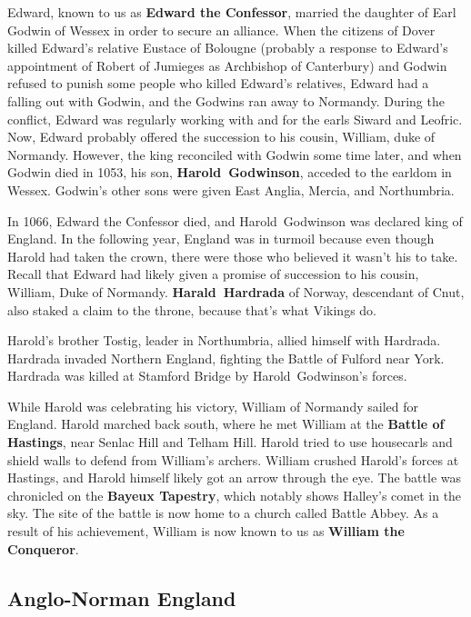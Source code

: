 Edward, known to us as \textbf{Edward the Confessor},
married the daughter of Earl Godwin of Wessex in order to secure an alliance.
When the citizens of Dover killed Edward's relative Eustace of Bolougne
(probably a response to Edward's appointment of Robert of Jumieges as Archbishop of Canterbury)
and Godwin refused to punish some people who killed Edward's relatives,
Edward had a falling out with Godwin, and the Godwins ran away to Normandy.
During the conflict, Edward was regularly working with and for the earls Siward and Leofric.
Now, Edward probably offered the succession to his cousin, William, duke of Normandy.
However, the king reconciled with Godwin some time later, and when Godwin died in 1053,
his son, \textbf{Harold~Godwinson}, acceded to the earldom in Wessex.
Godwin's other sons were given East Anglia, Mercia, and Northumbria.

In 1066, Edward the Confessor died, and Harold~Godwinson was declared king of England.
In the following year, England was in turmoil because even though Harold had taken the crown,
there were those who believed it wasn't his to take.
Recall that Edward had likely given a promise of succession to his cousin, William, Duke of Normandy.
\textbf{Harald~Hardrada} of Norway, descendant of Cnut, also staked a claim to the throne,
because that's what Vikings do.

Harold's brother Tostig, leader in Northumbria, allied himself with Hardrada.
Hardrada invaded Northern England, fighting the Battle of Fulford near York.
Hardrada was killed at Stamford Bridge by Harold~Godwinson's forces.

While Harold was celebrating his victory, William of Normandy sailed for England.
Harold marched back south, where he met William at the \textbf{Battle of Hastings},
near Senlac Hill and Telham Hill.
Harold tried to use housecarls and shield walls to defend from William's archers.
William crushed Harold's forces at Hastings, and Harold himself likely got an arrow through the eye.
The battle was chronicled on the \textbf{Bayeux Tapestry}, which notably shows Halley's comet in the sky.
The site of the battle is now home to a church called Battle Abbey.
As a result of his achievement, William is now known to us as \textbf{William the Conqueror}.

\subsection*{Anglo-Norman England}

